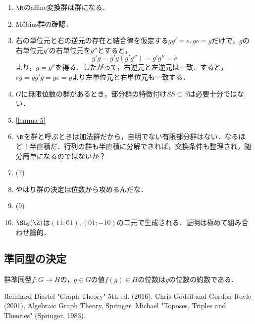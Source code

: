 \documentclass[uplatex,dvipdfmx]{jsreport}
\begin{document}
\begin{enumerate}
    \item $\R$のaffine変換群は群になる．
    \item Möbius群の確認．
    \item 右の単位元と右の逆元の存在と結合律を仮定する$gg'=e,ge=g$だけで，$g$の右単位元$g'$の右単位元を$g''$とすると，
    \[g'g=g'g(g'g'')=g'g''=e\]
    より，$g=g''$を得る．したがって，右逆元と左逆元は一致．すると，$eg=gg'g=ge=g$より左単位元と右単位元も一致する．
    \item $G$に無限位数の群があるとき，部分群の特徴付け$SS\subset S$は必要十分ではない．
    \item \ref{lemma-5}
    \item $\R$を群と呼ぶときは加法群だから，自明でない有限部分群はない．なるほど！半直積だ．行列の群も半直積に分解できれば，交換条件も整理され，随分簡単になるのではないか？
    \item (7)
    \item やはり群の決定は位数から攻めるんだな．
    \item (9)
    \item $\SL_2(\Z)$は$(11;01),(01;-10)$の二元で生成される．証明は極めて組み合わせ論的．
\end{enumerate}

\subsection{準同型の決定}

\begin{proposition}
    群準同型$f:G\to H$の，$g\in G$の値$f(g)\in H$の位数は$g$の位数の約数である．
\end{proposition}

\begin{thebibliography}{9}
    Reinhard Diestel "Graph Theory" 5th ed. (2016).
    Chris Godsil and Gordon Royle (2001), Algebraic Graph Theory, Springer.
    Michael "Toposes, Triples and Theories" (Springer, 1983).
\end{thebibliography}
\end{document}
